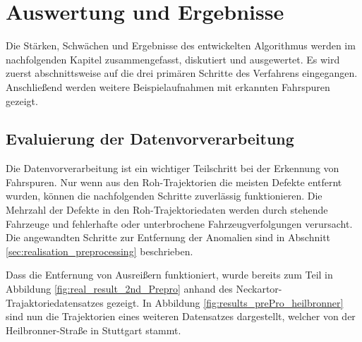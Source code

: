 
\chapter{Auswertung und Ergebnisse}
\label{cha:results}


Die Stärken, Schwächen und Ergebnisse des entwickelten Algorithmus werden im nachfolgenden Kapitel
zusammengefasst, diskutiert und ausgewertet. Es wird zuerst abschnittsweise auf die drei primären Schritte
des Verfahrens eingegangen. Anschließend werden weitere Beispielaufnahmen mit erkannten Fahrspuren gezeigt.

\section{Evaluierung der Datenvorverarbeitung}
\label{sec:results_eval_dataprocessing}



Die Datenvorverarbeitung ist ein wichtiger Teilschritt bei der Erkennung von Fahrspuren. Nur wenn aus
den Roh-Trajektorien die meisten Defekte entfernt wurden, können die nachfolgenden
Schritte zuverlässig funktionieren. Die Mehrzahl der Defekte in den Roh-Trajektoriedaten werden durch stehende
Fahrzeuge und fehlerhafte oder unterbrochene Fahrzeugverfolgungen verursacht. Die angewandten Schritte zur
Entfernung der Anomalien sind in Abschnitt \ref{sec:realisation_preprocessing} beschrieben.

Dass die Entfernung von Ausreißern funktioniert, wurde bereits zum Teil in Abbildung
\ref{fig:real_result_2nd_Prepro} anhand des Neckartor-Trajaktoriedatensatzes gezeigt.
In Abbildung \ref{fig:results_prePro_heilbronner} sind nun die Trajektorien eines weiteren Datensatzes dargestellt,
welcher von der Heilbronner-Straße in Stuttgart stammt.


